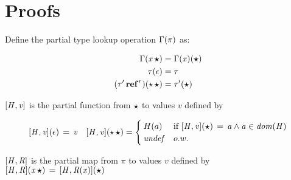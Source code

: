\documentclass[runningheads]{llncs}
\begin{document}
  

\section{Proofs}

Define the partial type lookup operation $\Gamma  (  \pi  )$ as:

\begin{align*}
  \Gamma  \ottsym{(}  \mathit{x} \, \oldvec{\star}  \ottsym{)} & = \Gamma  \ottsym{(}  \mathit{x}  \ottsym{)}  \ottsym{(}  \oldvec{\star}  \ottsym{)} \\
  \tau  \ottsym{(}   \epsilon   \ottsym{)} & = \tau \\
  \ottsym{(}   \tau'  \TREF^{ r }   \ottsym{)}  \ottsym{(}   \star  \, \oldvec{\star}  \ottsym{)} & = \tau'  \ottsym{(}  \oldvec{\star}  \ottsym{)}
\end{align*}


$[  \mathit{H}  ,  \mathit{v}  ]$ is the partial function from $\oldvec{\star}$ to values $v$
defined by

\begin{align*}
  \ottsym{[}  \ottnt{H}  \ottsym{,}  \ottnt{v}  \ottsym{]}  \ottsym{(}   \epsilon   \ottsym{)} \, \ottsym{=} \, \ottnt{v} && \ottsym{[}  \ottnt{H}  \ottsym{,}  \ottnt{v}  \ottsym{]}  \ottsym{(}   \star  \, \oldvec{\star}  \ottsym{)} = \begin{cases}
    H(a) & \text{if } \ottsym{[}  \ottnt{H}  \ottsym{,}  \ottnt{v}  \ottsym{]}  \ottsym{(}  \oldvec{\star}  \ottsym{)} \, \ottsym{=} \, \ottmv{a}  \wedge   \ottmv{a}  \in   \DOM( \ottnt{H} )   \\
    \mathit{undef} & o.w.
  \end{cases}
\end{align*}

$[  \mathit{H}  ,  \mathit{R}  ]$ is the partial map from $\pi$ to values $v$ defined by
$\ottsym{[}  \ottnt{H}  \ottsym{,}  \ottnt{R}  \ottsym{]}  \ottsym{(}  \mathit{x} \, \oldvec{\star}  \ottsym{)} \, \ottsym{=} \, \ottsym{[}  \ottnt{H}  \ottsym{,}  \ottnt{R}  \ottsym{(}  \mathit{x}  \ottsym{)}  \ottsym{]}  \ottsym{(}  \oldvec{\star}  \ottsym{)}$
\end{document}

